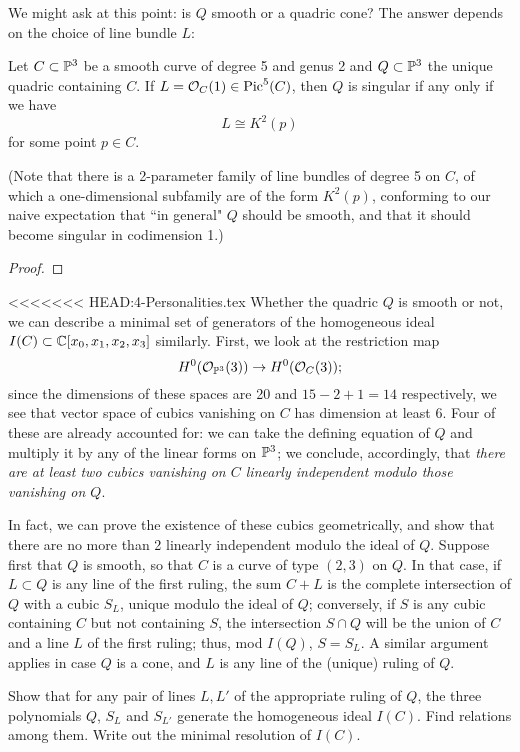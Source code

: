We might ask at this point: is $Q$ smooth or a quadric cone? The answer depends on the choice of line bundle $L$:

\begin{proposition}
Let $C \subset \PP^3$ be a smooth curve of degree 5 and genus 2 and $Q \subset \PP^3$ the unique quadric containing $C$. If $L = \cO_C(1) \in \pic^5(C)$, then $Q$ is singular if any only if we have
$$
L \cong K^2(p)
$$
for some point $p \in C$.
\end{proposition}

(Note that there is a 2-parameter family of line bundles of degree 5 on $C$, of which a one-dimensional subfamily are of the form $K^2(p)$, conforming to our naive expectation that ``in general" $Q$ should be smooth, and that it should become singular in codimension 1.)

\begin{proof}

\end{proof}

<<<<<<< HEAD:4-Personalities.tex
Whether the quadric $Q$ is smooth or not, we can describe a minimal set of generators of the homogeneous ideal $I(C) \subset \CC[x_0, x_1, x_2, x_3]$ similarly. First, we look at the restriction map
$$
H^0(\cO_{\PP^3}(3)) \to H^0(\cO_C(3));
$$
since the dimensions of these spaces are 20 and $15-2+1 = 14$ respectively, we see that  vector space of cubics vanishing on $C$ has dimension at least 6. Four of these are already accounted for: we can take the defining equation of $Q$ and multiply it by any of the linear forms on $\PP^3$; we conclude, accordingly, that \emph{there are at least two cubics vanishing on $C$ linearly independent modulo those vanishing on $Q$}.

In fact, we can prove the existence of these cubics geometrically, and show that there are no more than 2 linearly independent modulo the ideal of $Q$. Suppose first that $Q$ is smooth, so that $C$ is a curve of type $(2,3)$ on $Q$. In that case, if $L \subset Q$ is any line of the first ruling, the sum $C+L$ is the complete intersection of $Q$ with a cubic $S_L$, unique modulo the ideal of $Q$; conversely, if $S$ is any cubic containing $C$ but not containing $S$, the intersection $S \cap Q$ will be the union of $C$ and a line $L$ of the first ruling; thus, mod $I(Q)$, $S = S_L$. A similar argument applies in case $Q$ is a cone, and $L$ is any line of the (unique) ruling of $Q$.

\begin{exercise}
Show that for any pair of lines $L, L'$ of the appropriate ruling of $Q$, the three polynomials $Q$, $S_L$ and $S_{L'}$ generate the homogeneous ideal $I(C)$. Find relations among them. Write out the minimal resolution of $I(C)$.
\end{exercise}

